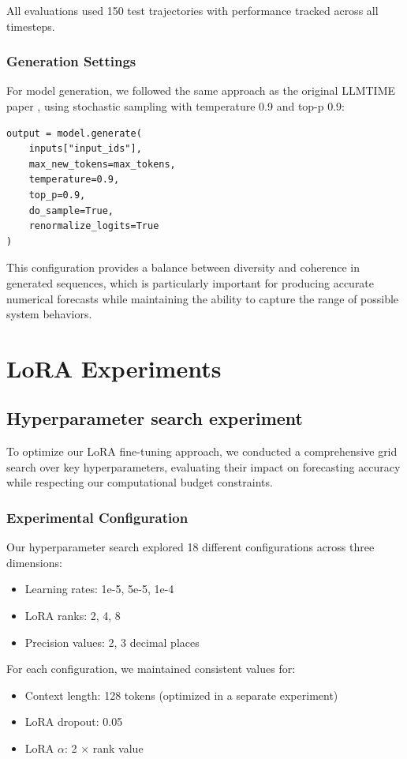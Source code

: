 \documentclass{article}
\begin{document}
All evaluations used 150 test trajectories with performance tracked across all timesteps.

\subsubsection*{Generation Settings}

For model generation, we followed the same approach as the original LLMTIME paper \cite{gruver2023large}, using stochastic sampling with temperature 0.9 and top-p 0.9:

\begin{verbatim}
output = model.generate(
    inputs["input_ids"],
    max_new_tokens=max_tokens,
    temperature=0.9,
    top_p=0.9,
    do_sample=True,
    renormalize_logits=True
)
\end{verbatim}

This configuration provides a balance between diversity and coherence in generated sequences, which is particularly important for producing accurate numerical forecasts while maintaining the ability to capture the range of possible system behaviors.
\section*{LoRA Experiments}
\subsection*{Hyperparameter search experiment}
To optimize our LoRA fine-tuning approach, we conducted a comprehensive grid search over key hyperparameters, evaluating their impact on forecasting accuracy while respecting our computational budget constraints.

\subsubsection*{Experimental Configuration}
Our hyperparameter search explored 18 different configurations across three dimensions:
\begin{itemize}
    \item Learning rates: 1e-5, 5e-5, 1e-4
    \item LoRA ranks: 2, 4, 8
    \item Precision values: 2, 3 decimal places
\end{itemize}

For each configuration, we maintained consistent values for:
\begin{itemize}
    \item Context length: 128 tokens (optimized in a separate experiment)
    \item LoRA dropout: 0.05
    \item LoRA $\alpha$: 2 $\times$ rank value
\end{itemize}
\end{document}

